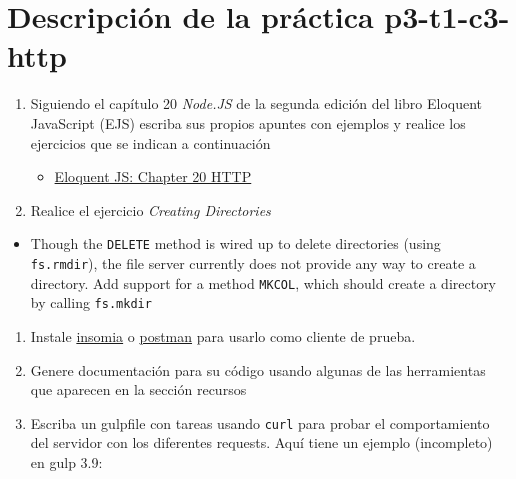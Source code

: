 \documentclass[]{article}
\date{}
\providecommand{\tightlist}{%
  \setlength{\itemsep}{0pt}\setlength{\parskip}{0pt}}
\begin{document}
\hypertarget{descripciuxf3n-de-la-pruxe1ctica-p3-t1-c3-http}{%
\section{Descripción de la práctica
p3-t1-c3-http}\label{descripciuxf3n-de-la-pruxe1ctica-p3-t1-c3-http}}

\begin{enumerate}
\def\labelenumi{\arabic{enumi}.}
\tightlist
\item
  Siguiendo el capítulo 20 \emph{Node.JS} de la segunda edición del
  libro Eloquent JavaScript (EJS) escriba sus propios apuntes con
  ejemplos y realice los ejercicios que se indican a continuación

  \begin{itemize}
  \tightlist
  \item
    \href{https://eloquentjavascript.net/2nd_edition/20_node.html}{Eloquent
    JS: Chapter 20 HTTP}
  \end{itemize}
\item
  Realice el ejercicio \emph{Creating Directories}
\end{enumerate}

\begin{itemize}
\tightlist
\item
  Though the \texttt{DELETE} method is wired up to delete directories
  (using \texttt{fs.rmdir}), the file server currently does not provide
  any way to create a directory. Add support for a method
  \texttt{MKCOL}, which should create a directory by calling
  \texttt{fs.mkdir}
\end{itemize}

\begin{enumerate}
\def\labelenumi{\arabic{enumi}.}
\setcounter{enumi}{3}
\tightlist
\item
  Instale \href{https://insomnia.rest/}{insomia} o
  \href{https://www.getpostman.com/}{postman} para usarlo como cliente
  de prueba.
\item
  Genere documentación para su código usando algunas de las herramientas
  que aparecen en la sección recursos
\item
  Escriba un gulpfile con tareas usando \texttt{curl} para probar el
  comportamiento del servidor con los diferentes requests. Aquí tiene un
  ejemplo (incompleto) en gulp 3.9:
\end{enumerate}
\end{document}
